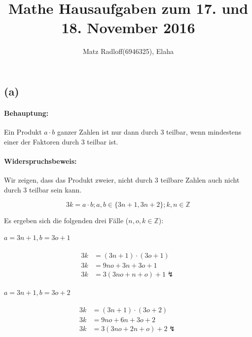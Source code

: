 \documentclass[11pt,a4paper]{article}
\title{\textbf{Mathe Hausaufgaben zum 17. und 18. November 2016}}
\author{Matz Radloff(6946325), Elaha}
\begin{document}
  \maketitle
  \date{}

\section{} %

\subsection*{(a)}

\paragraph{Behauptung:}
Ein Produkt $a \cdot b$ ganzer Zahlen ist nur dann durch $3$ teilbar, wenn mindestens einer der Faktoren durch $3$ teilbar ist.

\paragraph{Widerspruchsbeweis:}
Wir zeigen, dass das Produkt zweier, nicht durch $3$ teilbare Zahlen auch nicht durch $3$ teilbar sein kann.

\begin{equation*}
3k = a \cdot b; a,b \in \{3n+1, 3n+2\}; k,n \in \mathbb{Z}
\end{equation*}

Es ergeben sich die folgenden drei Fälle ($n, o, k \in \mathbb{Z}$):

\paragraph{$a = 3n+1, b = 3o+1$}

\begin{align*}
    3k &= (3n+1) \cdot (3o+1)\\
    3k &= 9no + 3n + 3o + 1\\
    3k &= 3(3no + n + o) + 1 \lightning
\end{align*}

\paragraph{$a = 3n+1, b = 3o+2$}

\begin{align*}
    3k &= (3n+1) \cdot (3o+2)\\
    3k &= 9no + 6n + 3o + 2\\
    3k &= 3(3no + 2n + o) + 2 \lightning
\end{align*}
\end{document}
